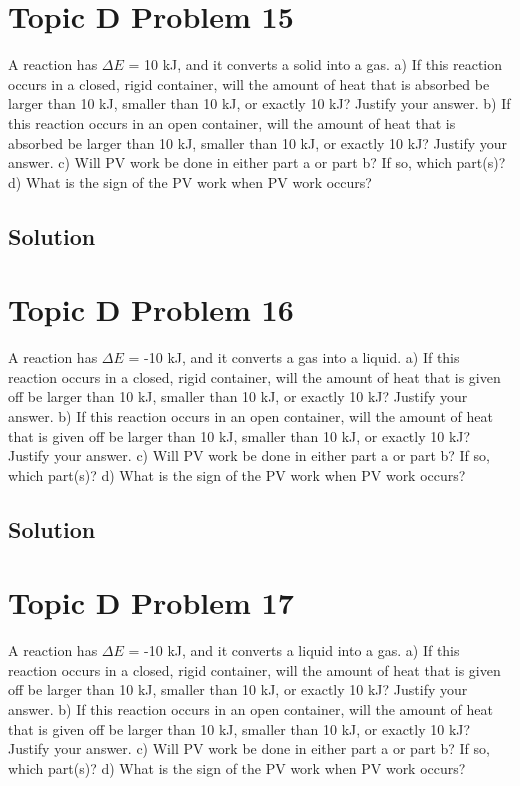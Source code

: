 \documentclass[10pt]{article}
\begin{document}
    \pagebreak
    \section{Topic D Problem 15}
        A reaction has $\Delta E$ = 10 kJ, and it converts a solid into a gas.
a) If this reaction occurs in a closed, rigid container, will the amount of heat that is absorbed
be larger than 10 kJ, smaller than 10 kJ, or exactly 10 kJ? Justify your answer.
b) If this reaction occurs in an open container, will the amount of heat that is absorbed be
larger than 10 kJ, smaller than 10 kJ, or exactly 10 kJ? Justify your answer.
c) Will PV work be done in either part a or part b? If so, which part(s)?
d) What is the sign of the PV work when PV work occurs?
        
        \subsection{Solution}

    \pagebreak
    \section{Topic D Problem 16}
        A reaction has $\Delta E$ = -10 kJ, and it converts a gas into a liquid.
a) If this reaction occurs in a closed, rigid container, will the amount of heat that is given off
be larger than 10 kJ, smaller than 10 kJ, or exactly 10 kJ? Justify your answer.
b) If this reaction occurs in an open container, will the amount of heat that is given off be
larger than 10 kJ, smaller than 10 kJ, or exactly 10 kJ? Justify your answer.
c) Will PV work be done in either part a or part b? If so, which part(s)?
d) What is the sign of the PV work when PV work occurs?
        
        \subsection{Solution}

    \pagebreak
    \section{Topic D Problem 17}
        A reaction has $\Delta E$ = -10 kJ, and it converts a liquid into a gas.
a) If this reaction occurs in a closed, rigid container, will the amount of heat that is given off
be larger than 10 kJ, smaller than 10 kJ, or exactly 10 kJ? Justify your answer.
b) If this reaction occurs in an open container, will the amount of heat that is given off be
larger than 10 kJ, smaller than 10 kJ, or exactly 10 kJ? Justify your answer.
c) Will PV work be done in either part a or part b? If so, which part(s)?
d) What is the sign of the PV work when PV work occurs?
        
\end{document}

